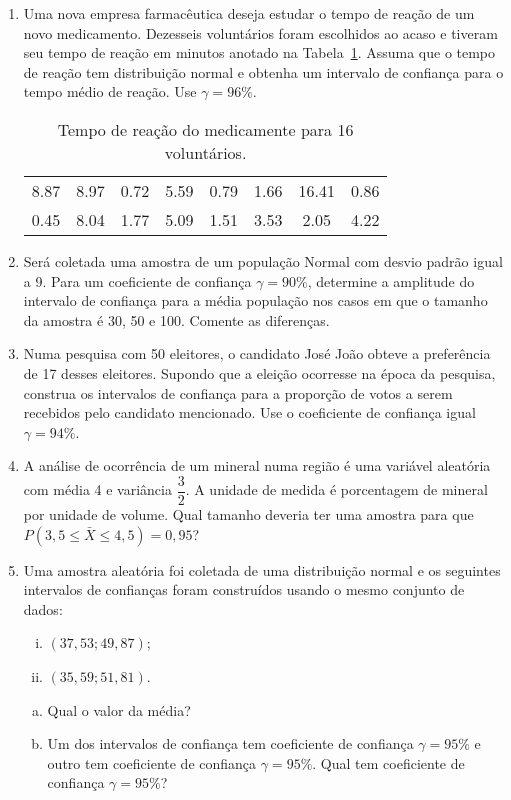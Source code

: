 \documentclass[12pt, a4paper]{article}
\begin{document}
\begin{enumerate}
  \item Uma nova empresa farmacêutica deseja estudar o tempo de reação de um novo medicamento. Dezesseis voluntários foram escolhidos ao acaso e tiveram seu tempo de reação em minutos anotado na Tabela~\ref{exe_1}. Assuma que o tempo de reação tem distribuição normal e obtenha um intervalo de confiança para o tempo médio de reação. Use $\gamma = 96\%$.
  \begin{table}[ht]
		\centering
		\caption{Tempo de reação do medicamente para 16 voluntários.}
		\begin{tabular}{cccccccc}
			\toprule[0.05cm]
			8.87 & 8.97 & 0.72 & 5.59 & 0.79 & 1.66 & 16.41 & 0.86 \\ 
			0.45 & 8.04 & 1.77 & 5.09 & 1.51 & 3.53 & 2.05 & 4.22 \\ 
			\bottomrule[0.05cm]
		\end{tabular}
		\label{exe_1}
	\end{table}
	
  \item Será coletada uma amostra de um população Normal com desvio padrão igual a 9. Para um coeficiente de confiança $\gamma=90\%$, determine a amplitude do intervalo de confiança para a média população nos casos em que o tamanho da amostra é 30, 50 e 100. Comente as diferenças.
  
  \item Numa pesquisa com 50 eleitores, o candidato José João obteve a preferência de 17 desses eleitores. Supondo que a eleição ocorresse na época da pesquisa, construa os intervalos de confiança para a proporção de votos a serem recebidos pelo candidato mencionado. Use o coeficiente de confiança igual $\gamma=94\%$.
  
  \item A análise de ocorrência de um mineral numa região é uma variável aleatória com média 4 e variância $\dfrac{3}{2}$. A unidade de medida é porcentagem de mineral por unidade de volume. Qual tamanho deveria ter uma amostra para que $P(3,5 \leq \bar{X} \leq 4,5) = 0,95$?

  \item Uma amostra aleatória foi coletada de uma distribuição normal e os seguintes intervalos de confianças foram construídos usando o mesmo conjunto de dados:
  \begin{enumerate}[i.]
  	\item $(37,53; 49,87)$;
  	\item $(35,59; 51,81)$.
  \end{enumerate}
  \begin{enumerate}[(a)]
  	\item Qual o valor da média?
  	\item Um dos intervalos de confiança tem coeficiente de confiança $\gamma=95\%$ e outro tem coeficiente de confiança $\gamma=95\%$. Qual tem coeficiente de confiança $\gamma=95\%$?
  \end{enumerate}
  

\end{enumerate}
\end{document}
